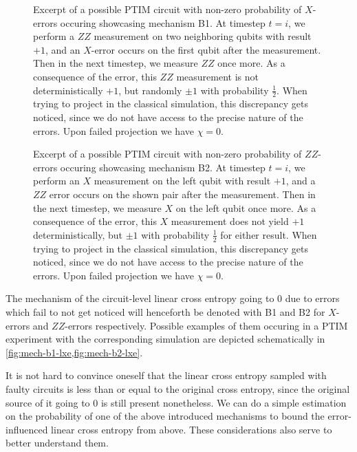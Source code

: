 \begin{figure}[t]
  \centering
  
  \caption{Excerpt of a possible PTIM circuit with non-zero probability of
  $X$-errors occuring showcasing mechanism \textsf{B1}. At timestep $t=i$, 
  we perform a $ZZ$ measurement on two neighboring qubits with result $+1$,
  and an $X$-error occurs on the first qubit after the measurement. Then in the next
  timestep, we measure $ZZ$ once more. As a consequence of the error, this $ZZ$
  measurement is not deterministically $+1$, but randomly $\pm 1$ with
  probability $\frac{1}{2}$. When trying to project in the classical
  simulation, this discrepancy gets noticed, since we do not have access to the
  precise nature of the errors. Upon failed projection we have $\chi=0$.}
  \label{fig:mech-b1-lxe}
\end{figure}

\begin{figure}[t]
  \centering
  
  \caption{Excerpt of a possible PTIM circuit with non-zero probability of
    $ZZ$-errors occuring showcasing mechanism \textsf{B2}. At timestep $t=i$,
    we perform an $X$ measurement on the left qubit with result $+1$, and a
    $ZZ$ error occurs on the shown pair after the measurement. Then in the next
    timestep, we measure $X$ on the left qubit once more. As a consequence of
    the error, this $X$ measurement does not yield $+1$ deterministically, but
    $\pm 1$ with probability $\frac{1}{2}$ for either result. When trying to
    project in the classical simulation, this discrepancy gets noticed, since we
    do not have access to the precise nature of the errors. Upon failed projection
    we have $\chi=0$.}
  \label{fig:mech-b2-lxe}
\end{figure}

The mechanism of the circuit-level linear cross entropy going to $0$ due to
errors which fail to not get noticed will henceforth be denoted with
\textsf{B1} and \textsf{B2} for $X$-errors and $ZZ$-errors respectively.
Possible examples of them occuring in a PTIM experiment with the corresponding simulation
are depicted schematically in \cref{fig:mech-b1-lxe,fig:mech-b2-lxe}.

It is not hard to convince oneself that the linear cross entropy sampled with
faulty circuits is less than or equal to the original cross entropy, since the
original source of it going to $0$ is still present nonetheless. We can do a
simple estimation on the probability of one of the above introduced mechanisms
to bound the error-influenced linear cross entropy from above. These
considerations also serve to better understand them.

